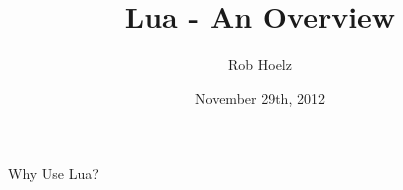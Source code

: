\documentclass{beamer}
\title{Lua - An Overview}
\author{Rob Hoelz}
\date{November 29th, 2012}
\begin{document}




\begin{frame}
\begin{center}
Why Use Lua?
\end{center}
\end{frame}











\end{document}
